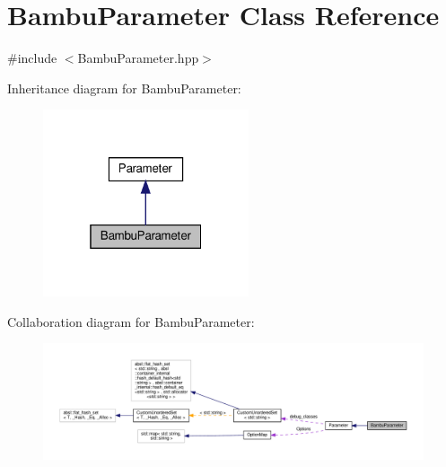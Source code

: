 \hypertarget{classBambuParameter}{}\section{Bambu\+Parameter Class Reference}
\label{classBambuParameter}


{\ttfamily \#include $<$Bambu\+Parameter.\+hpp$>$}



Inheritance diagram for Bambu\+Parameter\+:
\nopagebreak
\begin{figure}[H]
\begin{center}
\leavevmode
\includegraphics[width=172pt]{d2/d54/classBambuParameter__inherit__graph}
\end{center}
\end{figure}


Collaboration diagram for Bambu\+Parameter\+:
\nopagebreak
\begin{figure}[H]
\begin{center}
\leavevmode
\includegraphics[width=350pt]{d6/d4c/classBambuParameter__coll__graph}
\end{center}
\end{figure}
